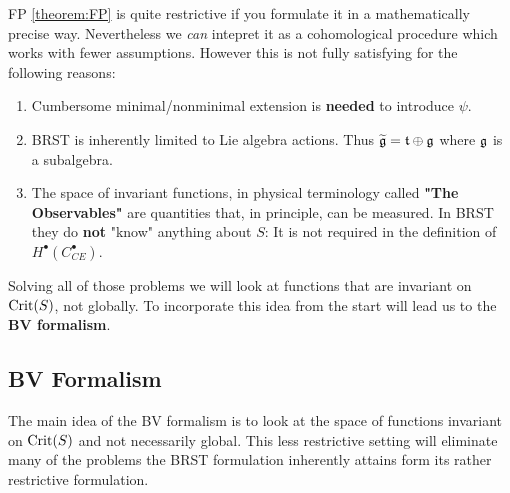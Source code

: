 \begin{rem}
  FP \ref{theorem:FP} is quite restrictive if you formulate it in a mathematically precise way. Nevertheless we \emph{can} intepret it as a cohomological procedure which works with fewer assumptions. However this is not fully satisfying for the following reasons:
  \begin{enumerate}
    \item Cumbersome minimal/nonminimal extension is \textbf{needed} to introduce $\psi$.
    \item BRST is inherently limited to Lie algebra actions. Thus $\widetilde{\mathfrak{g}} = \mathfrak{t} \oplus \mathfrak{g}$ where $\mathfrak{g}$ is a subalgebra.
    \item The space of invariant functions, in physical terminology called \textbf{"The Observables"} are quantities that, in principle, can be measured. In BRST they do \textbf{not} "know" anything about $S$: It is not required in the definition of $H^\bullet(C^\bullet_{CE})$.
  \end{enumerate}

  Solving all of those problems we will look at functions that are invariant on $\operatorname{Crit}(S)$, not globally. To incorporate this idea from the start will lead us to the \textbf{BV formalism}.
\end{rem}


\subsection{BV Formalism}
\label{subsec:BVFormalism}

The main idea of the BV formalism is to look at the space of functions invariant on $\operatorname{Crit}(S)$ and not necessarily global. This less restrictive setting will eliminate many of the problems the BRST formulation inherently attains form its rather restrictive formulation.

